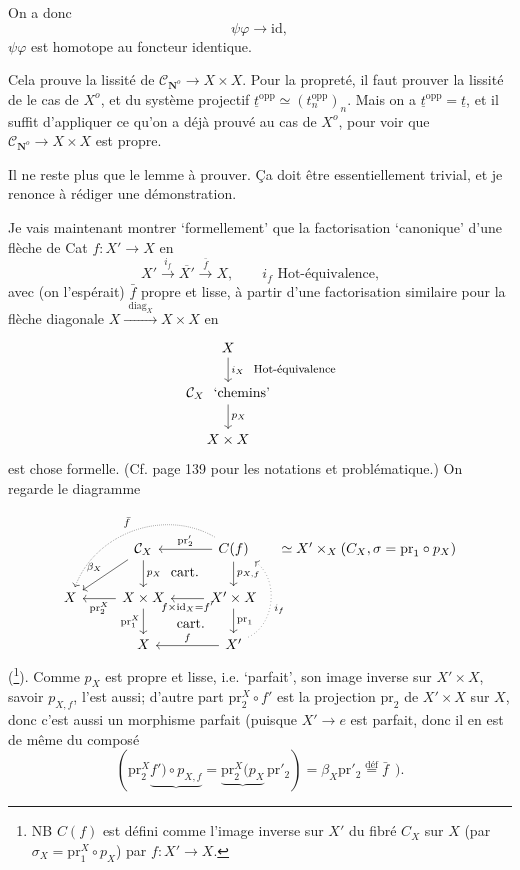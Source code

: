 \documentclass[11pt]{article}
\newcommand{\printedpage}[1]{\marginpar{\footnotesize p.~#1}}
\newcommand{\msp}[1]{\marginpar{\footnotesize [#1]}}
\newcommand{\CN}{\mathcal{C}_{\mathbf{N}^o}}
\begin{document}
On a donc
\[ \psi\varphi \longrightarrow \mathrm{id}, \]
$\psi\varphi$ est homotope au foncteur identique.

Cela prouve la lissité de $\CN \longrightarrow X \times X$. Pour la propreté, il faut prouver la lissité de le cas de $X^o$, et du système projectif $\underline{t}^{\mathrm{opp}} \simeq (t_n^{\mathrm{opp}})_n$. Mais on a $\underline{t}^{\mathrm{opp}} = \underline{t}$, et il suffit d'appliquer ce qu'on a déjà prouvé au cas de $X^o$, pour voir que $\CN \longrightarrow X \times X$ est propre. %

Il ne reste plus que le lemme à prouver. Ça doit être essentiellement
\msp{page 170}
trivial, et je renonce à rédiger une démonstration.

Je vais maintenant montrer `formellement' que la factorisation `canonique' d'une flèche de Cat $f : X' \longrightarrow X$ en
\[ X' \xrightarrow{i_f} \overline{X'} \xrightarrow{\bar{f}} X, \qquad i_f \text{ Hot-équivalence,} \]
avec (on l'espérait) $\bar{f}$ propre et lisse, à partir d'une factorisation similaire pour la flèche diagonale $X \xrightarrow{\ \ \mathrm{diag}_X\ \ } X \times X$ en
\[
\begin{tikzcd}
X \arrow[d, "i_X\ \ \text{\footnotesize Hot-équivalence}"] \\
\mathcal{C}_X\ \ \text{`chemins'} \arrow[d, "p_X"] \\
X \times X
\end{tikzcd}
\]
est chose formelle. (Cf. page 139 pour les notations et problématique.) On regarde le diagramme
\[
\begin{tikzcd}
 & \mathcal{C}_X \arrow[d, "p_X"] \arrow[dl, "\beta_X"'] \arrow[dr, phantom, "\text{cart.}"] & C(f) \arrow[l, "\mathrm{pr}'_2"'] \arrow[d, "p_{X,f}"] \arrow[dll, bend right=50, densely dotted, "\bar{f}"'] & [-1.5em] \simeq X' \times_X (C_X, \sigma = \mathrm{pr}_1 \circ p_X) \\ %
X & X \times X \arrow[l, "\mathrm{pr}_2^X"] \arrow[d, "\mathrm{pr}_1^X"'] \arrow[dr, phantom, "\text{cart.}"] & X' \times X \arrow[l, "f \times \mathrm{id}_X = f'"] \arrow[d, "\mathrm{pr}_1"] & \\
 & X & X' \arrow[l, "f"'] \arrow[uu, bend right=60, dotted, "i_f"'] &
\end{tikzcd}
\]
\printedpage{107}
(\footnote[40]{NB $C(f)$ est défini comme l'image inverse sur $X'$ du fibré $C_X$ sur $X$ (par $\sigma_X = \mathrm{pr}_1^X \circ p_X$) par $f : X' \longrightarrow X$.}). Comme $p_X$ est propre et lisse, i.e. `parfait', son image inverse sur $X' \times X$, savoir $p_{X,f}$, l'est aussi; d'autre part $\mathrm{pr}_2^X \circ f'$ est la
\msp{page 171}
projection $\mathrm{pr}_2$ de $X' \times X$ sur $X$, donc c'est aussi un morphisme parfait (puisque $X' \longrightarrow e$ est parfait, donc il en est de même du composé
\[ (\mathrm{pr}_2^X \underbrace{f') \circ p_{X,f}} = \underbrace{\mathrm{pr}_2^X(p_X}\, \mathrm{pr}'_2) = \beta_X \mathrm{pr}'_2 \overset{\text{déf}}{=} \bar{f} \ \ ). \]
\end{document}
